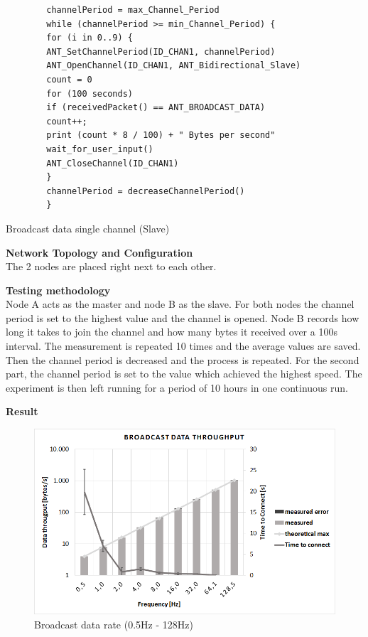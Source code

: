 \begin{description}
	\begin{code}[H]
		\begin{verbatim}
		channelPeriod = max_Channel_Period
		while (channelPeriod >= min_Channel_Period) {
		for (i in 0..9) {
		ANT_SetChannelPeriod(ID_CHAN1, channelPeriod)
		ANT_OpenChannel(ID_CHAN1, ANT_Bidirectional_Slave)
		count = 0
		for (100 seconds) 
		if (receivedPacket() == ANT_BROADCAST_DATA)
		count++;			  
		print (count * 8 / 100) + " Bytes per second"
		wait_for_user_input()
		ANT_CloseChannel(ID_CHAN1)
		}
		channelPeriod = decreaseChannelPeriod()
		}
		\end{verbatim}
		\caption{Broadcast data single channel (Slave)}\label{lst:sExp1}
	\end{code}	
	\item{\textbf{Network Topology and Configuration}} \hfill \\ The 2 nodes are placed right next to each other.
	\item{\textbf{Testing methodology}} \hfill \\Node A acts as the master and node B as the slave. For both nodes the channel period is set to the highest value and the channel is opened. Node B records how long it takes to join the channel and how many bytes it received over a 100s interval. The measurement is repeated 10 times and the average values are saved. Then the channel period is decreased and the process is repeated. For the second part, the channel period is set to the value which achieved the highest speed. The experiment is then left running for a period of 10 hours in one continuous run.
	\item{\textbf{Result}} \hfill \\  
	\begin{figure}[H]
		\centering
		\includegraphics[scale=0.5]{content/images/exp1_norm.png}
		\caption{Broadcast data rate (0.5Hz - 128Hz)}\label{fig:exp1norm}
	\end{figure}
	

\end{description}

